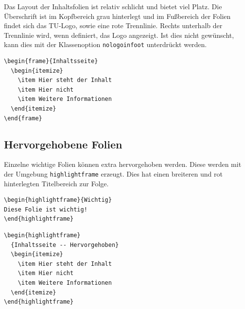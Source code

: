 \documentclass[cmyk,a4paper,colorscheme=green,TUBStitlepage=picture]{tubsreprt}
\begin{document}
Das Layout der Inhaltsfolien ist relativ schlicht und bietet viel Platz.
Die Überschrift ist im Kopfbereich grau hinterlegt und im Fußbereich der Folien
findet sich das TU-Logo, sowie eine rote Trennlinie.
Rechts unterhalb der Trennlinie wird, wenn definiert, das Logo angezeigt.
Ist dies nicht gewünscht, kann dies mit der Klassenoption
\lstinline{nologoinfoot} unterdrückt werden.

\begin{minipage}{0.5\textwidth}
\begin{verbatim}
\begin{frame}{Inhaltsseite}
  \begin{itemize}
    \item Hier steht der Inhalt
    \item Hier nicht
    \item Weitere Informationen
  \end{itemize}
\end{frame}
\end{verbatim}
\end{minipage}
\begin{minipage}{0.5\textwidth}
\end{minipage}

\subsection{Hervorgehobene Folien}

Einzelne wichtige Folien können extra hervorgehoben werden. Diese werden mit
der Umgebung \lstinline{highlightframe} erzeugt. Dies hat einen breiteren und
rot hinterlegten Titelbereich zur Folge.

\begin{example}
\begin{lstlisting}
\begin{highlightframe}{Wichtig}
Diese Folie ist wichtig!
\end{highlightframe}
\end{lstlisting}
\end{example}

\begin{minipage}{0.5\textwidth}
\begin{verbatim}
\begin{highlightframe}
  {Inhaltsseite -- Hervorgehoben}
  \begin{itemize}
    \item Hier steht der Inhalt
    \item Hier nicht
    \item Weitere Informationen
  \end{itemize}
\end{highlightframe}
\end{verbatim}
\end{minipage}
\begin{minipage}{0.5\textwidth}
\end{minipage}
\end{document}
